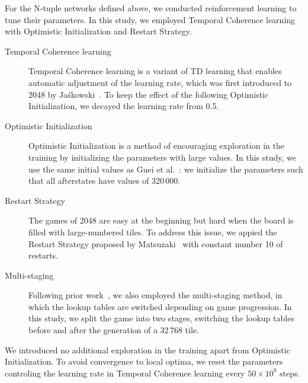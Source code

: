 
For the N-tuple networks defined above, we conducted reinforcement learning to tune their parameters.
In this study, we employed Temporal Coherence learning with Optimistic Initialization and Restart Strategy.
\begin{description}
 \item[Temporal Coherence learning] Temporal Coherence learning is a variant of TD learning that enables automatic adjustment of the learning rate, which was first introduced to 2048 by Ja\'skowski~\cite{Jas17}.  To keep the effect of the following Optimistic Initialization, we decayed the learning rate from 0.5.
 \item[Optimistic Initialization] Optimistic Initialization is a method of encouraging exploration in the training by initializing the parameters with large values.  In this study, we use the same initial values as Guei et al.~\cite{Guei22}: we initialize the parameters such that all afterstates have values of 320\,000.
 \item[Restart Strategy] The games of 2048 are easy at the beginning but hard when the board is filled with large-numbered tiles.  To address this issue, we appied the Restart Strategy proposed by Matsuzaki~\cite{Mats18} with constant number 10 of restarts.
 \item[Multi-staging] Following prior work~\cite{Guei22}, we also employed the multi-staging method, in which the lookup tables are switched depending on game progression. In this study, we split the game into two stages, switching the lookup tables before and after the generation of a 32\,768 tile.
\end{description}
We introduced no additional exploration in the training apart from Optimistic Initialization.
To avoid convergence to local optima, we reset the parameters controling the learning rate in Temporal Coherence learning every $50 \times 10^9$ steps.

